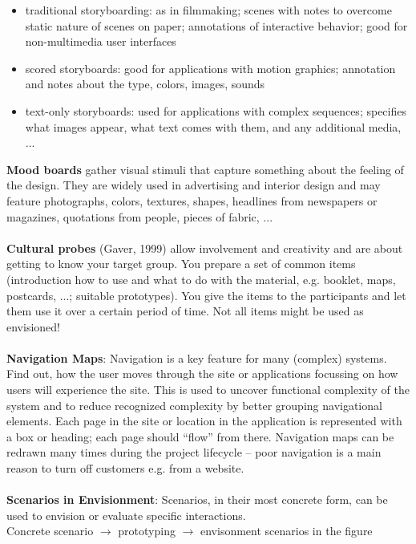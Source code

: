 \begin{itemize}
\item traditional storyboarding: as in filmmaking; scenes with notes to overcome static nature of scenes on paper; annotations of interactive behavior; good for non-multimedia user interfaces
\item scored storyboards: good for applications with motion graphics; annotation and notes about the type, colors, images, sounds
\item text-only storyboards: used for applications with complex sequences; specifies what images appear, what text comes with them, and any additional media, ...
\end{itemize}
\textbf{Mood boards} gather visual stimuli that capture something about the feeling of the design. They are widely used in advertising and interior design and may feature photographs, colors, textures, shapes, headlines from newspapers or magazines, quotations from people, pieces of fabric, ...\\\\
\textbf{Cultural probes} (Gaver, 1999) allow involvement and creativity and are about getting to know your target group. You prepare a set of common items (introduction how to use and what to do with the material, e.g. booklet, maps, postcards, ...; suitable prototypes). You give the items to the participants and let them use it over a certain period of time. Not all items might be used as envisioned!\\\\
\textbf{Navigation Maps}: Navigation is a key feature for many (complex) systems. Find out, how the user moves through the site or applications focussing on how users will experience the site. This is used to uncover functional complexity of the system and to reduce recognized complexity by better grouping navigational elements. Each page in the site or location in the application is represented with a box or heading; each page should ``flow'' from there. Navigation maps can be redrawn many times during the project lifecycle – poor navigation is a main reason to turn off customers e.g. from a website.\\\\
\textbf{Scenarios in Envisionment}: Scenarios, in their most concrete form, can be used to envision or evaluate specific interactions.\\
Concrete scenario $\rightarrow$  prototyping $\rightarrow$  envisonment scenarios in the figure\\
